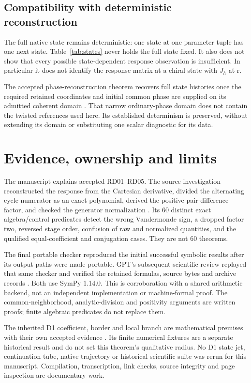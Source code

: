 \documentclass[11pt,a4paper]{article}
\numberwithin{equation}{section}
\theoremstyle{remark}\newtheorem{remark}[theorem]{Remark}
\begin{document}
\subsection{Compatibility with deterministic reconstruction}\label{sec:reconstruction-limit}
The full native state remains deterministic: one state at one parameter tuple has one next state. Table~\ref{tab:states} never holds the full state fixed. It also does not show that every possible state-dependent response observation is insufficient. In particular it does not identify the response matrix at a chiral state with $J_h$ at r.

The accepted phase-reconstruction theorem recovers full state histories once the required retained coordinates and initial common phase are supplied on its admitted coherent domain \cite[\texttt{thm:reconstruction}, \texttt{thm:phasebranch}]{phase}. That narrow ordinary-phase domain does not contain the twisted references used here. Its established determinism is preserved, without extending its domain or substituting one scalar diagnostic for its data.

\clearpage
\section{Evidence, ownership and limits}\label{sec:evidence}
The manuscript explains accepted RD01--RD05. The source investigation reconstructed the response from the Cartesian derivative, divided the alternating cycle numerator as an exact polynomial, derived the positive pair-difference factor, and checked the generator normalization \cite{rd}. Its 60 distinct exact algebra/control predicates detect the wrong Vandermonde sign, a dropped factor two, reversed stage order, confusion of raw and normalized quantities, and the qualified equal-coefficient and conjugation cases. They are not 60 theorems.

The final portable checker reproduced the initial successful symbolic results after its output paths were made portable. GPT's subsequent scientific review replayed that same checker and verified the retained formulas, source bytes and archive records \cite{review}. Both use SymPy 1.14.0. This is corroboration with a shared arithmetic backend, not an independent implementation or machine-formal proof. The common-neighborhood, analytic-division and positivity arguments are written proofs; finite algebraic predicates do not replace them.

The inherited D1 coefficient, border and local branch are mathematical premises with their own accepted evidence \cite{drift,d0d1}. Its finite numerical fixtures are a separate historical result and do not set this theorem's qualitative radius. No D1 state jet, continuation tube, native trajectory or historical scientific suite was rerun for this manuscript. Compilation, transcription, link checks, source integrity and page inspection are documentary work.
\end{document}
